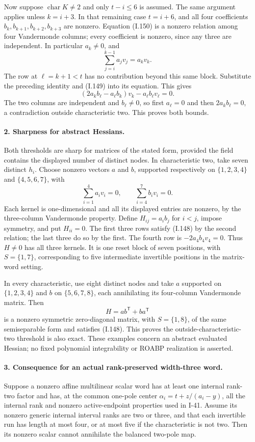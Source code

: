 Now suppose $\operatorname{char}K\ne2$ and only $t-i\le6$
is assumed. The same argument applies unless $k=i+3$.
In that remaining case $t=i+6$, and all four coefficients
$b_k,b_{k+1},b_{k+2},b_{k+3}$ are nonzero. Equation (I.150)
is a nonzero relation among four Vandermonde columns; every
coefficient is nonzero, since any three are independent.
In particular $a_k\ne0$, and
\[
 \sum_{j=i}^{k-1}a_jv_j=a_kv_k.
\]
The row at $\ell=k+1<t$ has no contribution beyond this same
block. Substitute the preceding identity and (I.149) into its
equation. This gives
\[
 (2a_kb_\ell-a_\ell b_k)v_k-a_\ell b_\ell v_\ell=0.
 \tag{I.151}
\]
The two columns are independent and $b_\ell\ne0$, so first
$a_\ell=0$ and then $2a_kb_\ell=0$, a contradiction outside
characteristic two. This proves both bounds.

\paragraph{2. Sharpness for abstract Hessians.}
Both thresholds are sharp for matrices of the stated form,
provided the field contains the displayed number of distinct
nodes. In characteristic two, take seven distinct $h_i$.
Choose nonzero vectors $a$ and $b$, supported respectively on
$\{1,2,3,4\}$ and $\{4,5,6,7\}$, with
\[
 \sum_{i=1}^4a_iv_i=0,
 \qquad\sum_{i=4}^7b_iv_i=0.
 \tag{I.152}
\]
Each kernel is one-dimensional and all its displayed entries
are nonzero, by the three-column Vandermonde property. Define
$H_{ij}=a_ib_j$ for $i<j$, impose symmetry, and put $H_{ii}=0$.
The first three rows satisfy (I.148) by the second relation;
the last three do so by the first. The fourth row is
$-2a_4b_4v_4=0$. Thus $H\ne0$ has all three kernels. It is
one reset block of seven positions, with $S=\{1,7\}$, corresponding to five
intermediate invertible positions in the matrix-word setting.

In every characteristic, use eight distinct nodes and take
$a$ supported on $\{1,2,3,4\}$ and $b$ on
$\{5,6,7,8\}$, each annihilating its four-column Vandermonde
matrix. Then
\[
 H=ab^{\mathsf T}+ba^{\mathsf T}
 \tag{I.153}
\]
is a nonzero symmetric zero-diagonal matrix, with $S=\{1,8\}$, of the same
semiseparable form and satisfies (I.148). This proves the
outside-characteristic-two threshold is also exact. These
examples concern an abstract evaluated Hessian; no fixed
polynomial integrability or ROABP realization is asserted.

\paragraph{3. Consequence for an actual rank-preserved width-three word.}
Suppose a nonzero affine multilinear scalar word has at least
one internal rank-two factor and has, at the common
one-pole center $\alpha_i=t+z/(a_i-y)$, all the internal rank
and nonzero active-endpoint properties used in I-41. Assume
its nonzero generic internal interval ranks are two or three,
and that each invertible run has length at most four, or at
most five if the characteristic is not two. Then its nonzero
scalar cannot annihilate the balanced two-pole map.

